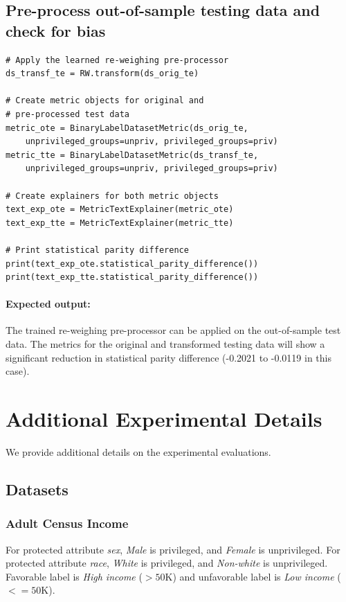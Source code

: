 \documentclass{article}
\begin{document}
\subsection{Pre-process out-of-sample testing data and check for bias}
\begin{verbatim}
# Apply the learned re-weighing pre-processor
ds_transf_te = RW.transform(ds_orig_te)

# Create metric objects for original and 
# pre-processed test data
metric_ote = BinaryLabelDatasetMetric(ds_orig_te,
    unprivileged_groups=unpriv, privileged_groups=priv)
metric_tte = BinaryLabelDatasetMetric(ds_transf_te,
    unprivileged_groups=unpriv, privileged_groups=priv)

# Create explainers for both metric objects
text_exp_ote = MetricTextExplainer(metric_ote)
text_exp_tte = MetricTextExplainer(metric_tte)

# Print statistical parity difference
print(text_exp_ote.statistical_parity_difference())
print(text_exp_tte.statistical_parity_difference())
\end{verbatim}

\paragraph{Expected output:} The trained re-weighing pre-processor can be applied on the out-of-sample test data. The metrics for the original and transformed testing data will show a significant reduction in statistical parity difference (-0.2021 to -0.0119 in this case).

\newpage

%
\section{Additional Experimental Details}
\label{appendix:expt_details}
We provide additional details on the experimental evaluations.

\subsection{Datasets}
\subsubsection{Adult Census Income}
For protected attribute \textit{sex}, \textit{Male} is privileged, and \textit{Female} is unprivileged. For protected attribute \textit{race}, \textit{White} is privileged, and \textit{Non-white} is unprivileged. Favorable label is \textit{High income} ($>50$K) and unfavorable label is \textit{Low income} ($<=50$K).
\end{document}
